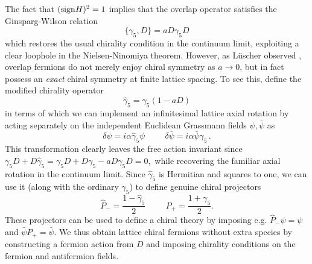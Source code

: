 \documentclass[11pt,a4paper]{article}
\theoremstyle{remark}
\begin{document}
The fact that $({\rm sign} H)^2 =1$ implies that the overlap operator satisfies the Ginsparg-Wilson relation \cite{GinspargWilson,NeubergerGW}
\begin{equation}
\{ \gamma_5,D \} = a D \gamma_5 D
\end{equation}
which restores the usual chirality condition in the continuum limit, exploiting a clear loophole in the Nielsen-Ninomiya theorem. However, as L\"{u}scher observed \cite{LuscherExactChiral}, overlap fermions do not merely enjoy chiral symmetry as $a \rightarrow 0$, but in fact possess an {\it exact} chiral symmetry at finite lattice spacing. To see this, define the modified chirality operator
\begin{equation}
\widehat{\gamma}_5 = \gamma_5 (1 - a D)
\end{equation}
in terms of which we can implement an infinitesimal lattice axial rotation by acting separately on the independent Euclidean Grassmann fields $\psi, \bar \psi$ as 
\begin{equation}
\delta \psi = i \alpha \widehat{\gamma}_5 \psi \hspace{1cm} \delta \bar{\psi} = i \alpha \bar{\psi} \gamma_5 \, .
\end{equation}
This transformation clearly leaves the free action invariant since $\gamma_5 D + D \widehat{\gamma}_5 = \gamma_5 D + D \gamma_5 - a D \gamma_5 D = 0,$ while recovering the familiar axial rotation in the continuum limit. Since $\widehat{\gamma}_5$ is Hermitian and squares to one, we can use it (along with the ordinary $\gamma_5$) to define genuine chiral projectors
\begin{equation}
\widehat{P}_- = \frac{1 - \widehat{\gamma}_5}{2} \hspace{1cm} P_+ = \frac{1 + \gamma_5}{2} .
\end{equation}
These projectors can be used to define a chiral theory by imposing e.g. $\widehat P_- \psi = \psi$ and $\bar \psi P_+ = \bar \psi$. We thus obtain lattice chiral fermions without extra species by constructing a fermion action from $D$ and imposing chirality conditions on the fermion and antifermion fields.
\end{document}
